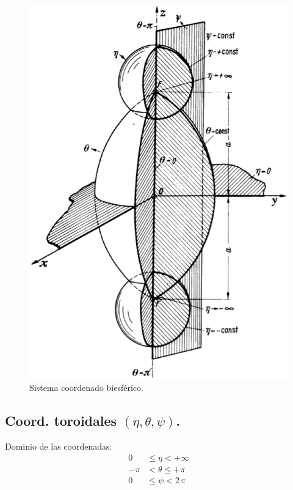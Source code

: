 \documentclass[12pt]{article}
\numberwithin{equation}{section}
\begin{document}
\begin{figure}[H]
    \centering
    \includegraphics[scale=0.4]{Imagenes/Sistema_Biesferico.eps}
    \caption{Sistema coordenado biesférico.}
\end{figure}

\subsection{Coord. toroidales \texorpdfstring{$(\eta, \theta, \psi)$}{(e, t, p)}.}

Dominio de las coordenadas:
\begin{align*}
0 &\leq \eta < +\infty \\
-\pi &< \theta \leq +\pi \\
0 &\leq \psi < 2\, \pi
\end{align*}
\end{document}
